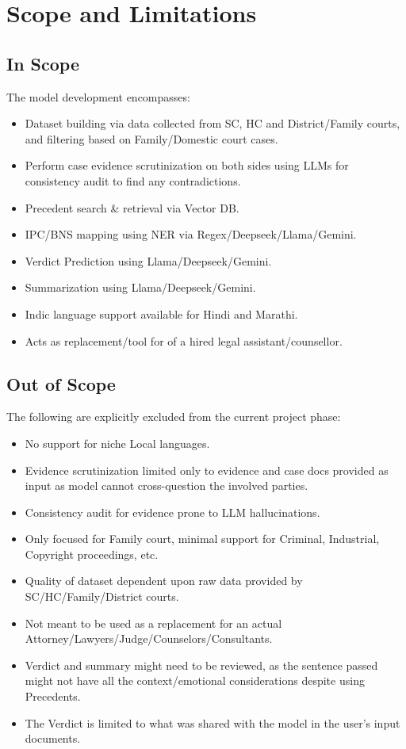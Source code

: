 \pagebreak
\section{Scope and Limitations}

\subsection{In Scope}
The model development encompasses:
\begin{itemize}
    \item Dataset building via data collected from SC, HC and District/Family courts, and filtering based on Family/Domestic court cases.
    \item Perform case evidence scrutinization on both sides using LLMs for consistency audit to find any contradictions.
	\item Precedent search \& retrieval via Vector DB.
    \item IPC/BNS mapping using NER via Regex/Deepseek/Llama/Gemini.
    \item Verdict Prediction using Llama/Deepseek/Gemini.
    \item Summarization using Llama/Deepseek/Gemini.
    \item Indic language support available for Hindi and Marathi.
    \item Acts as replacement/tool for of a hired legal assistant/counsellor.
\end{itemize}

\subsection{Out of Scope}
The following are explicitly excluded from the current project phase:
\begin{itemize}
    \item No support for niche Local languages.
    \item Evidence scrutinization limited only to evidence and case docs provided as input as model cannot cross-question the involved parties.
    \item Consistency audit for evidence prone to LLM hallucinations.
    \item Only focused for Family court, minimal support for Criminal, Industrial, Copyright proceedings, etc.
    \item Quality of dataset dependent upon raw data provided by SC/HC/Family/District courts.
    \item Not meant to be used as a replacement for an actual Attorney/Lawyers/Judge/Counselors/Consultants.
    \item Verdict and summary might need to be reviewed, as the sentence passed might not have all the context/emotional considerations despite using Precedents.
    \item The Verdict is limited to what was shared with the model in the user's input documents.
\end{itemize}

